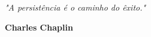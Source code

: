 %
%
\begin{epigrafe}
    \begin{flushright}
        \textit{"A persistência é o caminho do êxito."}
        \\ \vspace{\baselineskip}
        
        \textbf{Charles Chaplin}
    \end{flushright}
\end{epigrafe}


